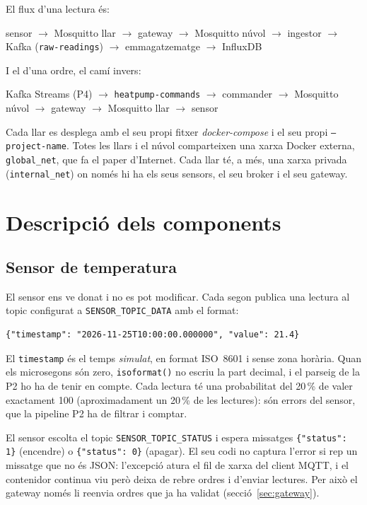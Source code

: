 \documentclass[11pt,a4paper]{article}
\begin{document}
El flux d'una lectura és:
\begin{center}
\small
sensor $\rightarrow$ Mosquitto llar $\rightarrow$ gateway $\rightarrow$
Mosquitto núvol $\rightarrow$ ingestor $\rightarrow$ Kafka
(\texttt{raw-readings}) $\rightarrow$ emmagatzematge $\rightarrow$ InfluxDB
\end{center}
I el d'una ordre, el camí invers:
\begin{center}
\small
Kafka Streams (P4) $\rightarrow$ \texttt{heatpump-commands} $\rightarrow$
commander $\rightarrow$ Mosquitto núvol $\rightarrow$ gateway $\rightarrow$
Mosquitto llar $\rightarrow$ sensor
\end{center}

Cada llar es desplega amb el seu propi fitxer \emph{docker-compose} i el seu
propi \texttt{--project-name}. Totes les llars i el núvol comparteixen una
xarxa Docker externa, \texttt{global\_net}, que fa el paper d'Internet. Cada
llar té, a més, una xarxa privada (\texttt{internal\_net}) on només hi ha els
seus sensors, el seu broker i el seu gateway.

\section{Descripció dels components}

\subsection{Sensor de temperatura}

El sensor ens ve donat i no es pot modificar. Cada segon publica una lectura
al topic configurat a \texttt{SENSOR\_TOPIC\_DATA} amb el format:
\begin{lstlisting}
{"timestamp": "2026-11-25T10:00:00.000000", "value": 21.4}
\end{lstlisting}
El \texttt{timestamp} és el temps \emph{simulat}, en format ISO~8601 i sense
zona horària. Quan els microsegons són zero, \texttt{isoformat()} no escriu la
part decimal, i el parseig de la P2 ho ha de tenir en compte. Cada lectura té
una probabilitat del 20\,\% de valer exactament 100 (aproximadament un 20\,\%
de les lectures): són errors del sensor, que la pipeline P2 ha de filtrar i
comptar.

El sensor escolta el topic \texttt{SENSOR\_TOPIC\_STATUS} i espera missatges
\texttt{\{"status": 1\}} (encendre) o \texttt{\{"status": 0\}} (apagar). El
seu codi no captura l'error si rep un missatge que no és JSON: l'excepció
atura el fil de xarxa del client MQTT, i el contenidor continua viu però deixa
de rebre ordres i d'enviar lectures. Per això el gateway només li reenvia
ordres que ja ha validat (secció~\ref{sec:gateway}).
\end{document}
